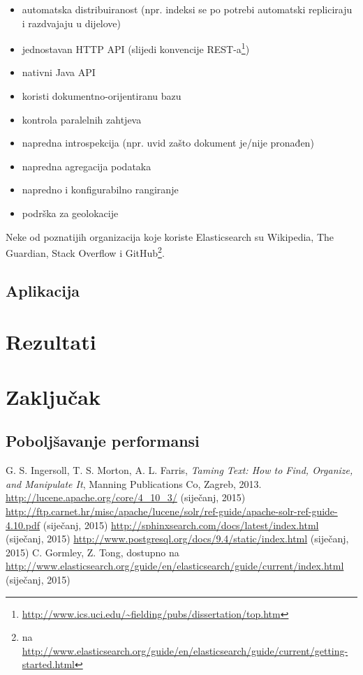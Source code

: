 \documentclass[a4paper,twoside,12pt]{scrreprt}
\begin{document}
\begin{itemize}
  \item automatska distribuiranost (npr. indeksi se po potrebi automatski repliciraju i razdvajaju u dijelove)
  \item jednostavan HTTP API (slijedi konvencije REST-a\footnote{\url{http://www.ics.uci.edu/~fielding/pubs/dissertation/top.htm}})
  \item nativni Java API
  \item koristi dokumentno-orijentiranu bazu
  \item kontrola paralelnih zahtjeva
  \item napredna introspekcija (npr. uvid zašto dokument je/nije pronađen)
  \item napredna agregacija podataka
  \item napredno i konfigurabilno rangiranje
  \item podrška za geolokacije
\end{itemize}

Neke od poznatijih organizacija koje koriste Elasticsearch su Wikipedia, The Guardian, Stack Overflow i GitHub\footnote{\cite{elastic} na \url{http://www.elasticsearch.org/guide/en/elasticsearch/guide/current/getting-started.html}}.

\section{Aplikacija}

\chapter{Rezultati}

\chapter{Zaključak}


\section{Poboljšavanje performansi}


\begin{thebibliography}{99}
   G. S. Ingersoll, T. S. Morton, A. L. Farris, \textit{Taming Text: How to Find, Organize, and Manipulate It}, Manning Publications Co, Zagreb, 2013.
   \url{http://lucene.apache.org/core/4_10_3/} (siječanj, 2015)
   \url{http://ftp.carnet.hr/misc/apache/lucene/solr/ref-guide/apache-solr-ref-guide-4.10.pdf} (siječanj, 2015)
   \url{http://sphinxsearch.com/docs/latest/index.html} (siječanj, 2015)
   \url{http://www.postgresql.org/docs/9.4/static/index.html} (siječanj, 2015)
   C. Gormley, Z. Tong, dostupno na \url{http://www.elasticsearch.org/guide/en/elasticsearch/guide/current/index.html} (siječanj, 2015)
\end{thebibliography}

\pagestyle{empty}

\begin{sazetak}
\end{sazetak}

\begin{summary}
\end{summary}

\begin{cv}
\end{cv}
\end{document}
